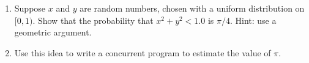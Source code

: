 \begin{questionS}
\begin{enumerate}
\item
Suppose $x$ and $y$ are random numbers, chosen with a uniform distribution on
$[0,1)$.  Show that the probability that $x^2+y^2 < 1.0$ is $\pi/4$.  Hint:
  use a geometric argument.

\item
Use this idea to write a concurrent program to estimate the value of $\pi$.

\end{enumerate}
\end{questionS}


